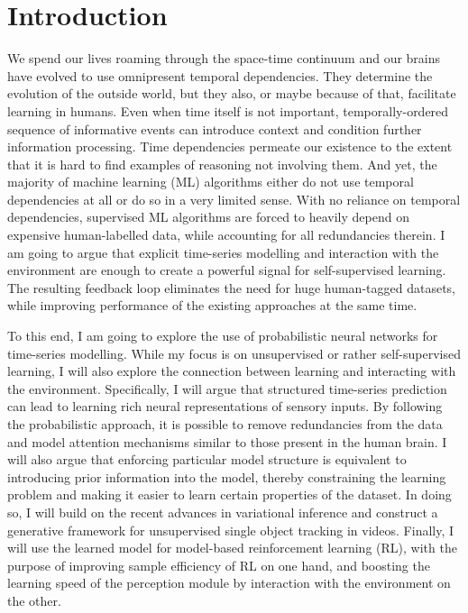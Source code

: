 \section{Introduction}    
    
    We spend our lives roaming through the space-time continuum and our brains have evolved to use omnipresent temporal dependencies. They determine the evolution of the outside world, but they also, or maybe because of that, facilitate learning in humans. Even when time itself is not important, temporally-ordered sequence of informative events can introduce context and condition further information processing. Time dependencies permeate our existence to the extent that it is hard to find examples of reasoning not involving them. And yet, the majority of machine learning (ML) algorithms either do not use temporal dependencies at all or do so in a very limited sense. 
    With no reliance on temporal dependencies, supervised ML algorithms are forced to heavily depend on expensive human-labelled data, while accounting for all redundancies therein. I am going to argue that explicit time-series modelling and interaction with the environment are enough to create a powerful signal for self-supervised learning. The resulting feedback loop eliminates the need for huge human-tagged datasets, while improving performance of the existing approaches at the same time.
    
    To this end, I am going to explore the use of probabilistic neural networks for time-series modelling. While my focus is on unsupervised or rather self-supervised learning, I will also explore the connection between learning and interacting with the environment. Specifically, I will argue that structured time-series prediction can lead to learning rich neural representations of sensory inputs. By following the probabilistic approach, it is possible to remove redundancies from the data and model attention mechanisms similar to those present in the human brain. I will also argue that enforcing particular model structure is equivalent to introducing prior information into the model, thereby constraining the learning problem and making it easier to learn certain properties of the dataset. In doing so, I will build on the recent advances in variational inference and construct a generative framework for unsupervised single object tracking in videos. Finally, I will use the learned model for model-based reinforcement learning (RL), with the purpose of improving sample efficiency of RL on one hand, and boosting the learning speed of the perception module by interaction with the environment on the other. 

